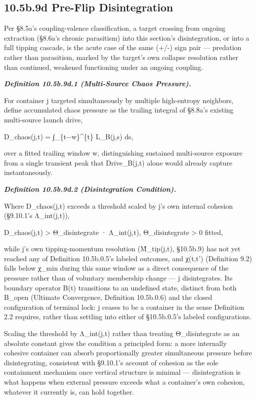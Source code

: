 \documentclass[
]{article}
\begin{document}
\hypertarget{b.9d-pre-flip-disintegration}{%
\subsection{10.5b.9d Pre-Flip
Disintegration}\label{b.9d-pre-flip-disintegration}}

Per §8.5a's coupling-valence classification, a target crossing from
ongoing extraction (§8.6a's chronic parasitism) into this section's
disintegration, or into a full tipping cascade, is the acute case of the
same (+/-) sign pair --- predation rather than parasitism, marked by the
target's own collapse resolution rather than continued, weakened
functioning under an ongoing coupling.

\emph{\textbf{Definition 10.5b.9d.1 (Multi-Source Chaos Pressure).}}

For container j targeted simultaneously by multiple high-entropy
neighbors, define accumulated chaos pressure as the trailing integral of
§8.8a's existing multi-source launch drive,

D\_chaos(j,t) = ∫\_\{t−w\}\^{}\{t\} L\_B(j,s) ds,

over a fitted trailing window w, distinguishing sustained multi-source
exposure from a single transient peak that Drive\_B(j,t) alone would
already capture instantaneously.

\emph{\textbf{Definition 10.5b.9d.2 (Disintegration Condition).}}

Where D\_chaos(j,t) exceeds a threshold scaled by j's own internal
cohesion (§9.10.1's Λ\_int(j,t)),

D\_chaos(j,t) \textgreater{} Θ\_disintegrate · Λ\_int(j,t),
Θ\_disintegrate \textgreater{} 0 fitted,

while j's own tipping-momentum resolution (M̃\_tip(j,t), §10.5b.9) has
not yet reached any of Definition 10.5b.0.5's labeled outcomes, and
χ(t,t') (Definition 9.2) falls below χ\_min during this same window as a
direct consequence of the pressure rather than of voluntary membership
change --- j disintegrates. Its boundary operator B(t) transitions to an
undefined state, distinct from both B\_open (Ultimate Convergence,
Definition 10.5b.0.6) and the closed configuration of terminal lock: j
ceases to be a container in the sense Definition 2.2 requires, rather
than settling into either of §10.5b.0.5's labeled configurations.

Scaling the threshold by Λ\_int(j,t) rather than treating
Θ\_disintegrate as an absolute constant gives the condition a principled
form: a more internally cohesive container can absorb proportionally
greater simultaneous pressure before disintegrating, consistent with
§9.10.1's account of cohesion as the sole containment mechanism once
vertical structure is minimal --- disintegration is what happens when
external pressure exceeds what a container's own cohesion, whatever it
currently is, can hold together.
\end{document}
